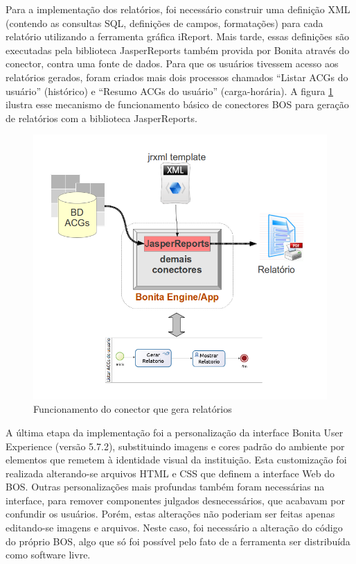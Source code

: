 \documentclass[12pt]{article}
\begin{document}

Para a implementação dos relatórios, foi necessário construir uma definição XML (contendo as consultas SQL, definições de campos, formatações)  para cada relatório utilizando a ferramenta gráfica iReport. Mais tarde, essas definições são executadas pela biblioteca JasperReports também provida por Bonita através do conector, contra uma fonte de dados. Para que os usuários tivessem acesso aos relatórios gerados, foram criados mais dois processos chamados “Listar ACGs do usuário” (histórico) e “Resumo ACGs do usuário” (carga-horária). A figura \ref{fig:reports} ilustra esse mecanismo de funcionamento básico de conectores BOS para geração de relatórios com a biblioteca JasperReports.

\begin{figure}[ht]
\centering
\includegraphics[width=.5\textwidth]{images/conector.png}
\caption{Funcionamento do conector que gera relatórios}
\label{fig:reports}
\end{figure}


A última etapa da implementação foi a personalização da interface Bonita User Experience (versão 5.7.2), substituindo imagens e cores padrão do ambiente por elementos que remetem à identidade visual da instituição. Esta customização foi realizada alterando-se arquivos HTML e CSS que definem a interface Web do BOS. Outras personalizações mais profundas também foram necessárias na interface, para remover componentes julgados desnecessários, que acabavam por confundir os usuários. Porém, estas alterações não poderiam ser feitas apenas editando-se imagens e arquivos. Neste caso, foi necessário a alteração do código do próprio BOS, algo que só foi possível pelo fato de a ferramenta ser distribuída como software livre.
\end{document}
